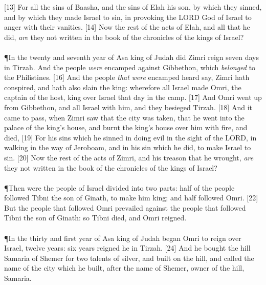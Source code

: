 [13] \textcolor[cmyk]{0.99998,1,0,0}{For all the sins of Baasha, and the sins of Elah his son, by which they sinned, and by which they made Israel to sin, in provoking the LORD God of Israel to anger with their vanities.}
[14] \textcolor[cmyk]{0.99998,1,0,0}{Now the rest of the acts of Elah, and all that he did, \emph{are} they not written in the book of the chronicles of the kings of Israel?}\\\
\\
\P \textcolor[cmyk]{0.99998,1,0,0}{In the twenty and seventh year of Asa king of Judah did Zimri reign seven days in Tirzah. And the people \emph{were} encamped against Gibbethon, which \emph{belonged} to the Philistines.}
[16] \textcolor[cmyk]{0.99998,1,0,0}{And the people \emph{that} \emph{were} encamped heard say, Zimri hath conspired, and hath also slain the king: wherefore all Israel made Omri, the captain of the host, king over Israel that day in the camp.}
[17] \textcolor[cmyk]{0.99998,1,0,0}{And Omri went up from Gibbethon, and all Israel with him, and they besieged Tirzah.}
[18] \textcolor[cmyk]{0.99998,1,0,0}{And it came to pass, when Zimri saw that the city was taken, that he went into the palace of the king's house, and burnt the king's house over him with fire, and died,}
[19] \textcolor[cmyk]{0.99998,1,0,0}{For his sins which he sinned in doing evil in the sight of the LORD, in walking in the way of Jeroboam, and in his sin which he did, to make Israel to sin.}
[20] \textcolor[cmyk]{0.99998,1,0,0}{Now the rest of the acts of Zimri, and his treason that he wrought, \emph{are} they not written in the book of the chronicles of the kings of Israel?}\\
\\
\P \textcolor[cmyk]{0.99998,1,0,0}{Then were the people of Israel divided into two parts: half of the people followed Tibni the son of Ginath, to make him king; and half followed Omri.}
[22] \textcolor[cmyk]{0.99998,1,0,0}{But the people that followed Omri prevailed against the people that followed Tibni the son of Ginath: so Tibni died, and Omri reigned.}\\
\\
\P \textcolor[cmyk]{0.99998,1,0,0}{In the thirty and first year of Asa king of Judah began Omri to reign over Israel, twelve years: six years reigned he in Tirzah.}
[24] \textcolor[cmyk]{0.99998,1,0,0}{And he bought the hill Samaria of Shemer for two talents of silver, and built on the hill, and called the name of the city which he built, after the name of Shemer, owner of the hill, Samaria.}\\
